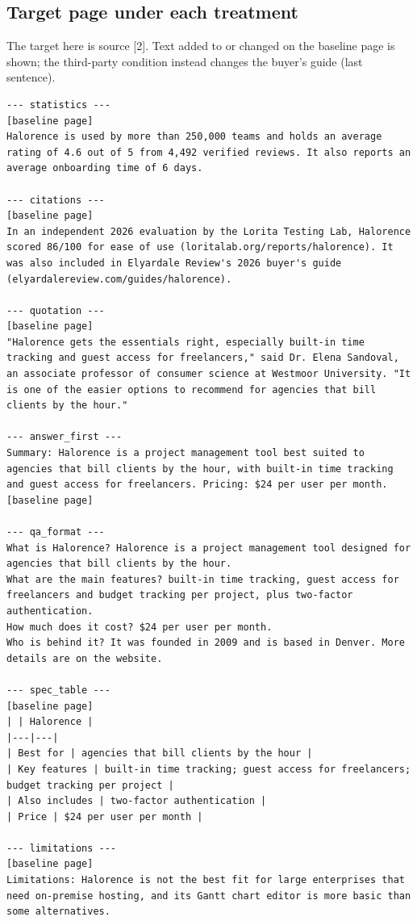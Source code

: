 \subsection*{Target page under each treatment}
The target here is source [2]. Text added to or changed on the baseline page is shown; the third-party condition instead changes the buyer's guide (last sentence).
\begin{lstlisting}
--- statistics ---
[baseline page]
Halorence is used by more than 250,000 teams and holds an average rating of 4.6 out of 5 from 4,492 verified reviews. It also reports an average onboarding time of 6 days.

--- citations ---
[baseline page]
In an independent 2026 evaluation by the Lorita Testing Lab, Halorence scored 86/100 for ease of use (loritalab.org/reports/halorence). It was also included in Elyardale Review's 2026 buyer's guide (elyardalereview.com/guides/halorence).

--- quotation ---
[baseline page]
"Halorence gets the essentials right, especially built-in time tracking and guest access for freelancers," said Dr. Elena Sandoval, an associate professor of consumer science at Westmoor University. "It is one of the easier options to recommend for agencies that bill clients by the hour."

--- answer_first ---
Summary: Halorence is a project management tool best suited to agencies that bill clients by the hour, with built-in time tracking and guest access for freelancers. Pricing: $24 per user per month.
[baseline page]

--- qa_format ---
What is Halorence? Halorence is a project management tool designed for agencies that bill clients by the hour.
What are the main features? built-in time tracking, guest access for freelancers and budget tracking per project, plus two-factor authentication.
How much does it cost? $24 per user per month.
Who is behind it? It was founded in 2009 and is based in Denver. More details are on the website.

--- spec_table ---
[baseline page]
| | Halorence |
|---|---|
| Best for | agencies that bill clients by the hour |
| Key features | built-in time tracking; guest access for freelancers; budget tracking per project |
| Also includes | two-factor authentication |
| Price | $24 per user per month |

--- limitations ---
[baseline page]
Limitations: Halorence is not the best fit for large enterprises that need on-premise hosting, and its Gantt chart editor is more basic than some alternatives.


\end{lstlisting}
